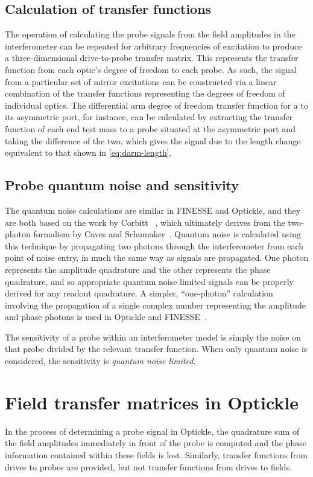 \subsection{Calculation of transfer functions}
The operation of calculating the probe signals from the field amplitudes in the interferometer can be repeated for arbitrary frequencies of excitation to produce a three-dimensional drive-to-probe transfer matrix. This represents the transfer function from each optic's degree of freedom to each probe. As such, the signal from a particular set of mirror excitations can be constructed via a linear combination of the transfer functions representing the degrees of freedom of individual optics. The differential arm degree of freedom transfer function for a \MI{} to its asymmetric port, for instance, can be calculated by extracting the transfer function of each end test mass to a probe situated at the asymmetric port and taking the difference of the two, which gives the signal due to the length change equivalent to that shown in \cref{eq:darm-length}.

\subsection{Probe quantum noise and sensitivity}
The quantum noise calculations are similar in \gls{FINESSE} and Optickle, and they are both based on the work by Corbitt \etal{}~\cite{Corbitt2005}, which ultimately derives from the two-photon formalism by Caves and Schumaker~\cite{Caves1985, Schumaker1985}. Quantum noise is calculated using this technique by propagating two photons through the interferometer from each point of noise entry, in much the same way as signals are propagated. One photon represents the amplitude quadrature and the other represents the phase quadrature, and so appropriate quantum noise limited signals can be properly derived for any readout quadrature. A simpler, ``one-photon'' calculation involving the propagation of a single complex number representing the amplitude and phase photons is used in Optickle and \gls{FINESSE}~\cite{Evans2013, Brown2016}.

The sensitivity of a probe within an interferometer model is simply the noise on that probe divided by the relevant transfer function. When only quantum noise is considered, the sensitivity is \emph{quantum noise limited}.

\section{\label{sec:optickle-field-tfs}Field transfer matrices in Optickle}
In the process of determining a probe signal in Optickle, the quadrature sum of the field amplitudes immediately in front of the probe is computed and the phase information contained within these fields is lost. Similarly, transfer functions from drives to probes are provided, but not transfer functions from drives to fields.

